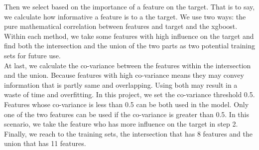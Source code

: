 \documentclass[conference]{IEEEtran}
\begin{document}
\indent Then we select based on the importance of a feature on the target. That is to say, we calculate how informative a feature is to a the target. We use two ways: the pure mathematical correlation between features and target and the xgboost. Within each method, we take some features with high influence on the target and find both the intersection and the union of the two parts as two potential training sets for future use. \\
\indent At last, we calculate the co-variance between the features within the intersection and the union. Because features with high co-variance means they may convey information that is partly same and overlapping. Using both may result in a waste of time and overfitting. In this project, we set the co-variance threshold 0.5. Features whose co-variance is less than 0.5 can be both used in the model. Only one of the two features can be used if the co-variance is greater than 0.5. In this scenario, we take the feature who has more influence on the target in step 2.\\ 
\indent Finally, we reach to the training sets, the intersection that has 8 features and the union that has 11 features.

%





%
%
%
\end{document}

